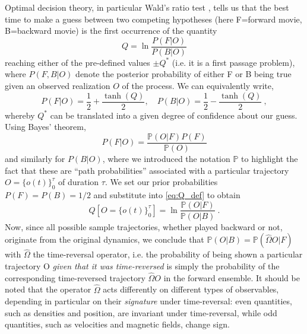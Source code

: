 Optimal decision theory, in particular Wald's ratio test \cite{PhysRevLett.115.250602}, tells us that the best time to make a guess between two competing hypotheses (here F=forward movie, B=backward movie) is the first occurrence of the quantity 
%
\begin{equation}\label{eq:Q_def}
    Q = \ln \frac{P(F|O)}{P(B|O)}
\end{equation}
%
reaching either of the pre-defined values $\pm Q^*$ (i.e. it is a first passage problem),
where $P(F,B|O)$ denote the posterior probability of either F or B being true given an observed realization $O$ of the process. We can equivalently write,
%
\begin{equation}
    P(F|O) = \frac{1}{2} + \frac{\tanh(Q)}{2},\quad P(B|O) = \frac{1}{2} - \frac{\tanh(Q)}{2}~,
\end{equation}
%
whereby $Q^*$ can be translated into a given degree of confidence about our guess. Using Bayes' theorem,
%
\begin{equation}
    P(F|O) = \frac{\mathbb{P}(O|F)P(F)}{\mathbb{P}(O)}
\end{equation}
%
and similarly for $P(B|O)$,
where we introduced the notation $\mathbb{P}$ to highlight the fact that these are ``path probabilities'' associated with a particular trajectory $O = \{o(t)\}_0^\tau$ of duration $\tau$. We set our prior probabilities $P(F) = P(B) = 1/2$ and substitute into \eqref{eq:Q_def} to obtain
%
\begin{equation}\label{eq:Q_def_paths}
    Q[O = \{o(t)\}_0^\tau] = \ln \frac{\mathbb{P}(O|F)}{\mathbb{P}(O|B)}~.
\end{equation}
%
Now, since all possible sample trajectories, whether played backward or not, originate from the original dynamics, we conclude that $\mathbb{P}(O|B) = \mathbb{P}(\hat{\Omega} O|F)$ with $\hat{\Omega}$ the time-reversal operator, i.e. the probability of being shown a particular trajectory O \emph{given that it was time-reversed} is simply the probability of the corresponding time-reversed trajectory $\hat{\Omega}O$ in the forward ensemble. It should be noted that the operator $\hat{\Omega}$ acts differently on different types of observables, depending in particular on their \emph{signature} under time-reversal: even quantities, such as densities and position, are invariant under time-reversal, while odd quantities, such as velocities and magnetic fields, change sign.


